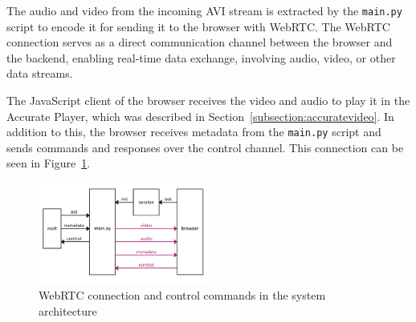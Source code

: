 \documentclass[../MasterThesis.tex]{subfiles}
\begin{document}
The audio and video from the incoming AVI stream is extracted by the \texttt{main.py} script to encode it for sending it to the browser with WebRTC. The WebRTC connection serves as a direct communication channel between the browser and the backend, enabling real-time data exchange, involving audio, video, or other data streams. 


%


The JavaScript client of the browser receives the video and audio to play it in the Accurate Player, which was described in Section~\ref{subsection:accuratevideo}. In addition to this, the browser
receives metadata from the \texttt{main.py} script and sends commands and responses over the control channel. This connection can be seen in Figure~\ref{figure:videoaudio}.


\begin{figure}[H]
	\centering
	\includegraphics[width=0.5\textwidth]{IM_wrtc_control.png}
	\caption[WebRTC and control in the system architecture]{WebRTC connection and control commands in the system architecture}
	\label{figure:videoaudio}
\end{figure}
\end{document}
